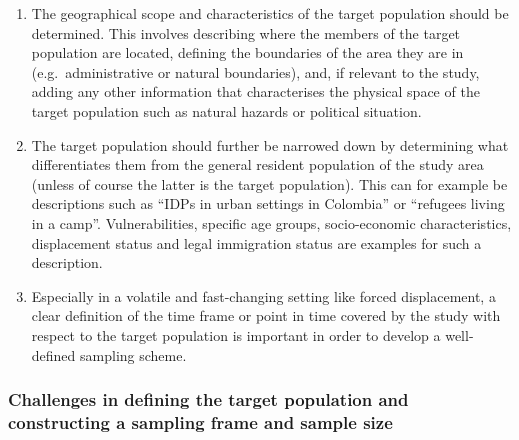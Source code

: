 \documentclass[
]{article}
\begin{document}
\begin{enumerate}
\def\labelenumi{\arabic{enumi}.}
\setcounter{enumi}{138}
\item
  The geographical scope and characteristics of the target population
  should be determined. This involves describing where the members of
  the target population are located, defining the boundaries of the
  area they are in (e.g.~administrative or natural boundaries), and,
  if relevant to the study, adding any other information that
  characterises the physical space of the target population such as
  natural hazards or political situation.
\item
  The target population should further be narrowed down by
  determining what differentiates them from the general resident
  population of the study area (unless of course the latter is the
  target population). This can for example be descriptions such as
  ``IDPs in urban settings in Colombia'' or ``refugees living in a camp''.
  Vulnerabilities, specific age groups, socio-economic
  characteristics, displacement status and legal immigration status
  are examples for such a description.
\item
  Especially in a volatile and fast-changing setting like forced
  displacement, a clear definition of the time frame or point in time
  covered by the study with respect to the target population is
  important in order to develop a well-defined sampling scheme.
\end{enumerate}

\hypertarget{section-2}{%
\subsubsection{}\label{section-2}}

\hypertarget{b.2.-challenges-in-defining-the-target-population-and-constructing-a-sampling-frame-and-sample-size}{%
\subsubsection{Challenges in defining the target population and constructing a sampling frame and sample size}\label{b.2.-challenges-in-defining-the-target-population-and-constructing-a-sampling-frame-and-sample-size}}
\end{document}
